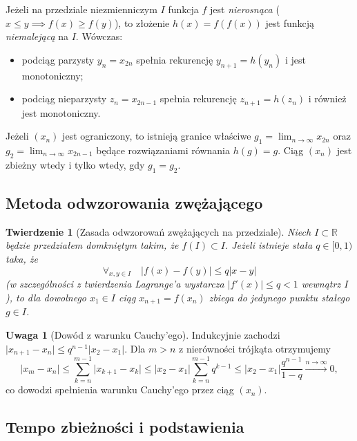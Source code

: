 \documentclass[11pt, a4paper]{article}
\theoremstyle{plain}
\newtheorem*{twierdzenie}{Twierdzenie}
\theoremstyle{definition}
\newtheorem*{uwaga}{Uwaga}
\begin{document}
Jeżeli na przedziale niezmienniczym $I$ funkcja $f$ jest \emph{nierosnąca} ($x \leqslant y \implies f(x) \geqslant f(y)$), to złożenie $h(x) = f(f(x))$ jest funkcją \emph{niemalejącą} na $I$. Wówczas:
\begin{itemize}
    \item podciąg parzysty $y_n = x_{2n}$ spełnia rekurencję $y_{n+1} = h(y_n)$ i jest monotoniczny;
    \item podciąg nieparzysty $z_n = x_{2n-1}$ spełnia rekurencję $z_{n+1} = h(z_n)$ i również jest monotoniczny.
\end{itemize}
Jeżeli $(x_n)$ jest ograniczony, to istnieją granice właściwe $g_1 = \lim_{n\to\infty} x_{2n}$ oraz $g_2 = \lim_{n\to\infty} x_{2n-1}$ będące rozwiązaniami równania $h(g) = g$. Ciąg $(x_n)$ jest zbieżny wtedy i tylko wtedy, gdy $g_1 = g_2$.

\subsection{Metoda odwzorowania zwężającego}

\begin{twierdzenie}[Zasada odwzorowań zwężających na przedziale]
Niech $I \subset \mathbb{R}$ będzie przedziałem domkniętym takim, że $f(I) \subset I$. Jeżeli istnieje stała $q \in [0, 1)$ taka, że
\[
\forall_{x, y \in I} \quad \lvert f(x) - f(y) \rvert \leqslant q \lvert x - y \rvert
\]
(w szczególności z twierdzenia Lagrange'a wystarcza $\lvert f'(x) \rvert \leqslant q < 1$ wewnątrz $I$), to dla dowolnego $x_1 \in I$ ciąg $x_{n+1} = f(x_n)$ zbiega do jedynego punktu stałego $g \in I$.
\end{twierdzenie}

\begin{uwaga}[Dowód z warunku Cauchy'ego]
Indukcyjnie zachodzi $\lvert x_{n+1} - x_n \rvert \leqslant q^{n-1} \lvert x_2 - x_1 \rvert$. Dla $m > n$ z nierówności trójkąta otrzymujemy
\[
\lvert x_m - x_n \rvert \leqslant \sum_{k=n}^{m-1} \lvert x_{k+1} - x_k \rvert \leqslant \lvert x_2 - x_1 \rvert \sum_{k=n}^{m-1} q^{k-1} \leqslant \lvert x_2 - x_1 \rvert \frac{q^{n-1}}{1 - q} \xrightarrow{n\to\infty} 0,
\]
co dowodzi spełnienia warunku Cauchy'ego przez ciąg $(x_n)$.
\end{uwaga}

\subsection{Tempo zbieżności i podstawienia}
\end{document}
